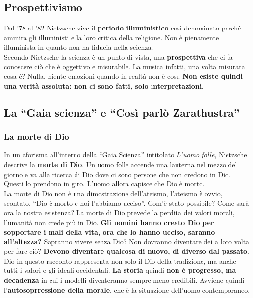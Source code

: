 \subsection{Prospettivismo}
Dal '78 al '82 Nietzsche vive il \textbf{periodo illuministico} così denominato perché ammira gli
illuministi e la loro critica della religione. Non è pienamente illuminista in quanto non ha
fiducia nella scienza.\\
Secondo Nietzsche la scienza è un punto di vista, una \textbf{prospettiva} che ci fa conoscere ciò che
è oggettivo e misurabile. La musica infatti, una volta misurata cosa è? Nulla, niente emozioni quando
in realtà non è così. \textbf{Non esiste quindi una verità assoluta: non ci sono fatti, solo 
interpretazioni}. 

\subsection{La ``Gaia scienza'' e ``Così parlò Zarathustra''}
\subsubsection{La morte di Dio}
In un aforisma all'interno della ``Gaia Scienza'' intitolato \textit{L'uomo folle}, Nietzsche descrive
la \textbf{morte di Dio}. Un uomo folle accende una lanterna nel mezzo del giorno e va alla ricerca
di Dio dove ci sono persone che non credono in Dio. Questi lo prendono in giro. L'uomo allora capisce
che Dio è morto.\\
La morte di Dio non è una dimostrazione dell'ateismo, l'ateismo è ovvio, scontato. ``Dio è morto e
noi l'abbiamo ucciso''. Com'è stato possibile? Come sarà ora la nostra esistenza? La morte di Dio
prevede la perdita dei valori morali, l'umanità non crede più in Dio. \textbf{Gli uomini hanno
creato Dio per sopportare i mali della vita, ora che lo hanno ucciso, saranno all'altezza?} Sapranno
vivere senza Dio? Non dovranno diventare dei a loro volta per fare ciò? \textbf{Devono diventare
qualcosa di nuovo, di diverso dal passato}.\\
Dio in questo racconto rappresenta non solo il Dio della tradizione, ma anche tutti i valori e gli
ideali occidentali. \textbf{La storia} quindi \textbf{non è progresso, ma decadenza} in cui i modelli
diventeranno sempre meno credibili. Avviene quindi l'\textbf{autosoprressione della morale}, che è
la situazione dell'uomo contemporaneo.
